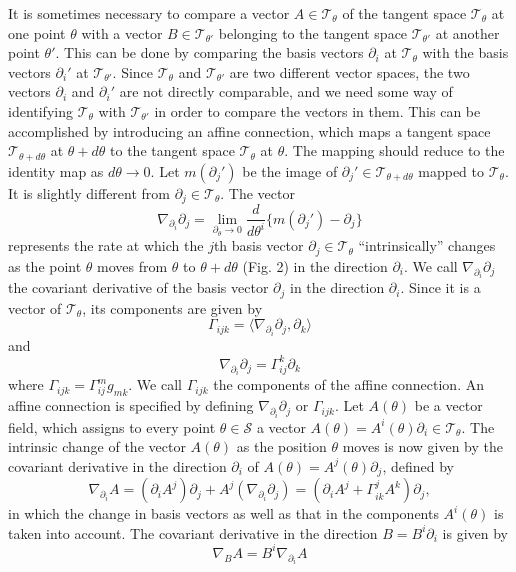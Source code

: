 \documentclass[11pt]{article}
\begin{document}
It is sometimes necessary to compare a vector $A \in
\mathcal{T}_\theta$ of the tangent space $\mathcal{T}_\theta$ at one
point $\theta$ with a vector $B \in \mathcal{T}_{\theta'}$ belonging
to the tangent space $\mathcal{T}_{\theta'}$ at another point
$\theta'$.  This can be done by comparing the basis vectors
$\partial_i$ at $\mathcal{T}_\theta$ with the basis vectors
$\partial_i'$ at $\mathcal{T}_{\theta'}$.  Since $\mathcal{T}_\theta$
and $\mathcal{T}_{\theta'}$ are two different vector spaces, the two
vectors $\partial_i$ and $\partial_i'$ are not directly comparable,
and we need some way of identifying $\mathcal{T}_\theta$ with
$\mathcal{T}_{\theta'}$ in order to compare the vectors in them.  This
can be accomplished by introducing an affine connection, which maps a
tangent space $\mathcal{T}_{\theta + d\theta}$ at $\theta + d\theta$
to the tangent space $\mathcal{T}_\theta$ at $\theta$.  The mapping
should reduce to the identity map as $d\theta \to 0$.  Let
$m(\partial_j')$ be the image of $\partial_j' \in \mathcal{T}_{\theta
  + d\theta}$ mapped to $\mathcal{T}_\theta$.  It is slightly
different from $\partial_j \in \mathcal{T}_\theta$.  The vector
\[
\nabla_{\partial_i} \partial_j = \lim_{\partial_\theta\to 0} \frac{d}{d\theta^i}\{m(\partial_j') - \partial_j\}
\]
represents the rate at which the $j$th basis vector $\partial_j \in
\mathcal{T}_\theta$ ``intrinsically'' changes as the point $\theta$
moves from $\theta$ to $\theta + d\theta$ (Fig. 2) in the direction
$\partial_i$.  We call $\nabla_{\partial_i} \partial_j$ the covariant
derivative of the basis vector $\partial_j$ in the direction
$\partial_i$.  Since it is a vector of $\mathcal{T}_\theta$, its
components are given by
\begin{equation}
\Gamma_{ijk} = \langle \nabla_{\partial_i}\partial_j, \partial_k \rangle \tag{2.2}\label{eq:2.2}
\end{equation}
and
\[
\nabla_{\partial_i}\partial_j = \Gamma_{ij}^k \partial_k
\]
where $\Gamma_{ijk} = \Gamma_{ij}^m g_{mk}$.  We call $\Gamma_{ijk}$
the components of the affine connection.  An affine connection is
specified by defining $\nabla_{\partial_i} \partial_j$ or
$\Gamma_{ijk}$.  Let $A(\theta)$ be a vector field, which assigns to
every point $\theta \in \mathcal{S}$ a vector $A(\theta) = A^i(\theta)
\partial_i \in \mathcal{T}_\theta$.  The intrinsic change of the
vector $A(\theta)$ as the position $\theta$ moves is now given by the
covariant derivative in the direction $\partial_i$ of $A(\theta) =
A^j(\theta)\partial_j$, defined by
\[
\nabla_{\partial_i} A = (\partial_i A^j) \partial_j + A^j
(\nabla_{\partial_i} \partial_j) = (\partial_i A^j + \Gamma_{ik}^j
A^k)\partial_j,
\]
in which the change in basis vectors as well as that in the components
$A^i(\theta)$ is taken into account.  The covariant derivative in the
direction $B = B^i \partial_i$ is given by
\[
\nabla_B A = B^i\nabla_{\partial_i} A
\]
\end{document}
